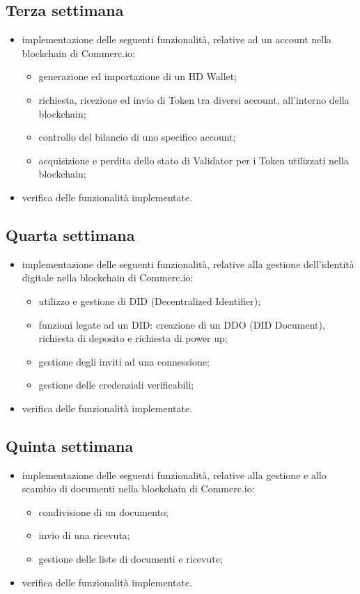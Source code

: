 \subsection*{Terza settimana}
\begin{itemize}
	\item implementazione delle seguenti funzionalità, relative ad un account nella blockchain di Commerc.io:
	\begin{itemize}
		\item generazione ed importazione di un HD Wallet;
		\item richiesta, ricezione ed invio di Token tra diversi account, all'interno della blockchain;
		\item controllo del bilancio di uno specifico account;
		\item acquisizione e perdita dello stato di Validator per i Token utilizzati nella blockchain;
	\end{itemize}
	\item verifica delle funzionalità implementate.
\end{itemize}

\subsection*{Quarta settimana} 
\begin{itemize}
	\item implementazione delle seguenti funzionalità, relative alla gestione dell'identità digitale nella blockchain di Commerc.io:
	\begin{itemize}
		\item utilizzo e gestione di DID (Decentralized Identifier);
		\item funzioni legate ad un DID: creazione di un DDO (DID Document), richiesta di deposito e richiesta di power up;
		\item gestione degli inviti ad una connessione;
		\item gestione delle credenziali verificabili;
	\end{itemize}
	\item verifica delle funzionalità implementate.
\end{itemize}

\subsection*{Quinta settimana} 
\begin{itemize}
	\item implementazione delle seguenti funzionalità, relative alla gestione e allo scambio di documenti nella blockchain di Commerc.io:
	\begin{itemize}
		\item condivisione di un documento;
		\item invio di una ricevuta;
		\item gestione delle liste di documenti e ricevute;
	\end{itemize}
	\item verifica delle funzionalità implementate.
\end{itemize}

